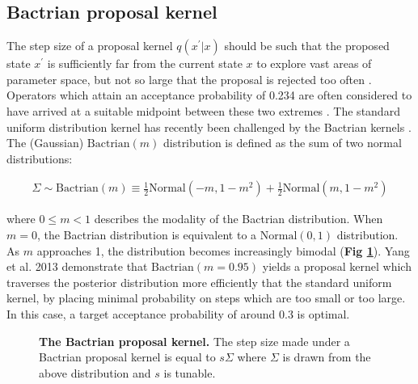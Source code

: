 \documentclass[10pt,letterpaper]{article}
\begin{document}
\clearpage
\subsection*{Bactrian proposal kernel} \label{sect:randomwalks}



The step size of a proposal kernel $q(x^\prime|x)$ should be such that the proposed state $x^\prime$ is sufficiently far from the current state $x$ to explore vast areas of parameter space, but not so large that the proposal is rejected too often \cite{roberts1997weak}. 
Operators which attain an acceptance probability of 0.234 are often considered to have arrived at a suitable midpoint between these two extremes \cite{bouckaert2019beast, roberts1997weak}.
The standard uniform distribution kernel has recently been challenged by the Bactrian kernels \cite{yang2013searching, thawornwattana2018designing}.
The (Gaussian) $\text{Bactrian}(m)$ distribution is defined as the sum of two normal distributions:


\begin{align}
	\Sigma \sim \text{Bactrian}(m) \equiv \frac{1}{2}\text{Normal}(-m, 1-m^2) + \frac{1}{2}\text{Normal}(m, 1-m^2)
\end{align}


\noindent
where $0 \leq m < 1$ describes the modality of the Bactrian distribution. When $m=0$, the Bactrian distribution is equivalent to a $\text{Normal}(0, 1)$ distribution. 
As $m$ approaches 1, the distribution becomes increasingly bimodal (\textbf{Fig \ref{fig:bactrian}}). 
Yang et al. 2013 \cite{yang2013searching} demonstrate that $\text{Bactrian}(m=0.95)$ yields a proposal kernel which traverses the posterior distribution more efficiently that the standard uniform kernel, by placing minimal probability on steps which are too small or too large.
In this case, a target acceptance probability of around 0.3 is optimal.


\begin{figure}[!h]
\caption{\textbf{The Bactrian proposal kernel.} The step size made under a Bactrian proposal kernel is equal to $s \Sigma$ where $\Sigma$ is drawn from the above distribution and $s$ is tunable.   }
\label{fig:bactrian}
\end{figure}
\end{document}
